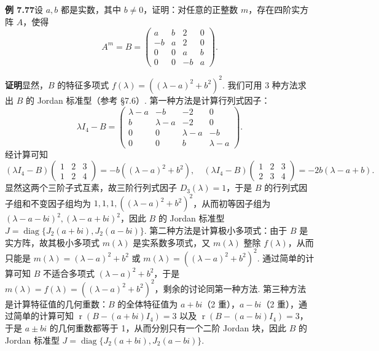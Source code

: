 \documentclass[UTF8, 12pt, fontset=fandol, oneside]{ctexart}
\begin{document}
\noindent\textbf{例 7.77}\quad 设 $a,b$ 都是实数，其中 $b\ne0$，证明：对任意的正整数 $m$，存在四阶实方阵 $A$，使得
\[
A^m=B=\left(\begin{array}{rrrr}
a&b&2&0\\
-b&a&2&0\\
0&0&a&b\\
0&0&-b&a
\end{array}\right).
\]

\noindent\textbf{证明}\quad 显然，$B$ 的特征多项式 $f(\lambda)=((\lambda-a)^2+b^2)^2$. 我们可用 3 种方法求出 $B$ 的 Jordan 标准型（参考 §7.6）. 第一种方法是计算行列式因子：
\[
\lambda I_4-B=\left(\begin{array}{rrrr}
\lambda-a&-b&-2&0\\
b&\lambda-a&-2&0\\
0&0&\lambda-a&-b\\
0&0&b&\lambda-a
\end{array}\right).
\]
经计算可知
\[
(\lambda I_4-B)\left(\begin{array}{ccc}1&2&3\\1&2&4\end{array}\right)=-b((\lambda-a)^2+b^2),\quad
(\lambda I_4-B)\left(\begin{array}{ccc}1&2&3\\2&3&4\end{array}\right)=-2b(\lambda-a+b).
\]
显然这两个三阶子式互素，故三阶行列式因子 $D_3(\lambda)=1$，于是 $B$ 的行列式因子组和不变因子组均为 $1,1,1,((\lambda-a)^2+b^2)^2$，从而初等因子组为 $(\lambda-a-bi)^2,(\lambda-a+bi)^2$，因此 $B$ 的 Jordan 标准型 $J=\operatorname{diag}\{J_2(a+bi),J_2(a-bi)\}$. 第二种方法是计算极小多项式：由于 $B$ 是实方阵，故其极小多项式 $m(\lambda)$ 是实系数多项式，又 $m(\lambda)$ 整除 $f(\lambda)$，从而只能是 $m(\lambda)=(\lambda-a)^2+b^2$ 或 $m(\lambda)=((\lambda-a)^2+b^2)^2$. 通过简单的计算可知 $B$ 不适合多项式 $(\lambda-a)^2+b^2$，于是 $m(\lambda)=f(\lambda)=((\lambda-a)^2+b^2)^2$，剩余的讨论同第一种方法. 第三种方法是计算特征值的几何重数：$B$ 的全体特征值为 $a+bi$（2 重），$a-bi$（2 重），通过简单的计算可知 $\operatorname{r}(B-(a+bi)I_4)=3$ 以及 $\operatorname{r}(B-(a-bi)I_4)=3$，于是 $a\pm bi$ 的几何重数都等于 1，从而分别只有一个二阶 Jordan 块，因此 $B$ 的 Jordan 标准型 $J=\operatorname{diag}\{J_2(a+bi),J_2(a-bi)\}$.
\end{document}
